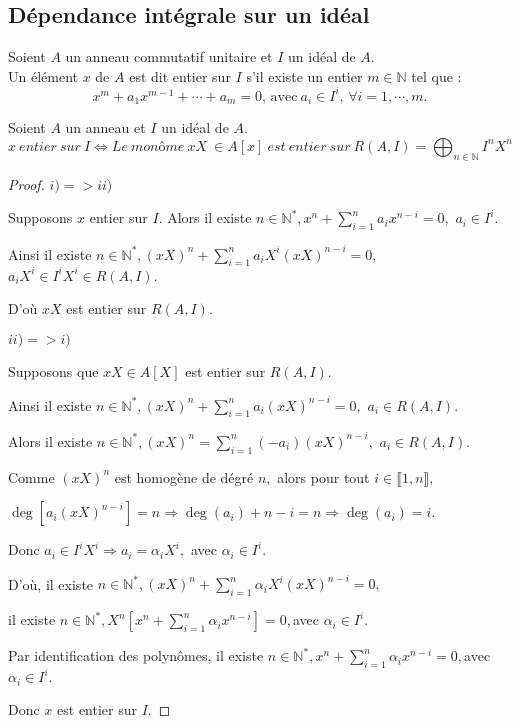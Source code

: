 \subsection{Dépendance intégrale sur un idéal}
\begin{madefinition}
	Soient $A$ un anneau commutatif unitaire et $I$ un idéal de $A$.\\ Un élément $x$ de $A$ est dit entier sur $I$ s'il existe un entier $m \in \mathbb{N}$ tel que : 
	\[ 	x^m + a_1 x^{m-1} + \cdots + a_m = 0\text{, avec} \ a_i \in I^i,\, \forall i=1, \cdots ,m. \]	
\end{madefinition}
\begin{monlemme}
	Soient $A$ un anneau et $I$ un idéal de $A$.
	\[ x \ entier \ sur \ I \Longleftrightarrow Le \ monôme \ xX \ \in A[x] \ est \ entier \ sur \ R(A, I) = \displaystyle \bigoplus_{n \in \mathbb{N}}{I^nX^n} \]
\end{monlemme}
\begin{proof}
	$i)=>ii)$
	
	Supposons $x$ entier sur $I.$ Alors il existe $n\in \mathbb{N}^{\ast },x^{n}+\sum\limits_{i=1}^{n}a_{i}x^{n-i}=0,$ $a_{i}\in I^{i}.$
	
	Ainsi il existe $n\in \mathbb{N}^{\ast },(xX)^{n}+\sum\limits_{i=1}^{n}a_{i}X^{i}(xX)^{n-i}=0,$ $%
	a_{i}X^{i}\in I^{i}X^{i}\in R(A,I).$
	
	D'où  $xX$ est entier sur $R(A,I).$
	
	$ii)=>i)$
	
	Supposons que  $xX\in A[X]$ est entier sur $R(A,I).$
	
	Ainsi il existe $n\in \mathbb{N}^{\ast },(xX)^{n}+\sum\limits_{i=1}^{n}a_{i}(xX)^{n-i}=0,$ $a_{i}\in R(A,I).
	$
	
	Alors il existe $n\in \mathbb{N}^{\ast },(xX)^{n}=\sum\limits_{i=1}^{n}(-a_{i})(xX)^{n-i},$ $a_{i}\in
	R(A,I).$
	
	Comme $(xX)^{n}$ est homogène de dégré $n,$ alors pour tout $%
	i\in \llbracket 1, n \rrbracket,$
	
	$\deg [a_{i}(xX)^{n-i}]=n\Rightarrow \deg (a_{i})+n-i=n\Rightarrow \deg
	(a_{i})=i.$
	
	Donc $a_{i}\in I^{i}X^{i}\Rightarrow a_{i}=\alpha _{i}X^{i},$ avec $\alpha
	_{i}\in I^{i}.$
	
	D'où,  il existe $n\in \mathbb{N}^{\ast },(xX)^{n}+\sum\limits_{i=1}^{n}\alpha _{i}X^{i}(xX)^{n-i}=0,$
	
	il existe $n\in \mathbb{N}^{\ast },X^{n}[x^{n}+\sum\limits_{i=1}^{n}\alpha _{i}x^{n-i}]=0,$avec $\alpha _{i}\in I^{i}.$
	
	Par identification des polyn\^{o}mes, il existe $n\in \mathbb{N}^{\ast },x^{n}+\sum\limits_{i=1}^{n}\alpha _{i}x^{n-i}=0,$avec $\alpha_{i}\in I^{i}.$
	
	Donc $x$ est entier sur $I.$
\end{proof}
